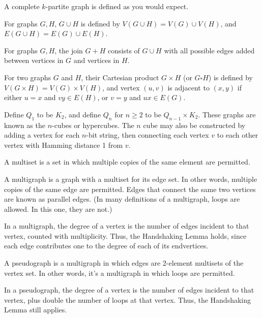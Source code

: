 \documentclass{article}
\begin{document}
    A complete $k$-partite graph is defined as you would expect.

\medskip
{}

    For graphs $G, H$, $G \cup H$ is defined by $V(G \cup H) = V(G) \cup V(H)$, and $E(G \cup H) = E(G) \cup E(H)$.

\medskip
{}

    For graphs $G, H$, the join $G + H$ consists of $G \cup H$ with all possible edges added between vertices in $G$ and vertices in $H$.

\medskip
{}

    For two graphs $G$ and $H$, their Cartesian product $G \times H$ (or $G \square H$) is defined by $V(G \times H) = V(G) \times V(H)$, and vertex $(u,v)$ is adjacent to $(x,y)$ if either $u=x$ and $vy \in E(H)$, or $v=y$ and $ux \in E(G)$.

\medskip
{}

    Define $Q_1$ to be $K_2$, and define $Q_n$ for $n \geq 2$ to be $Q_{n-1} \times K_2$.
    These graphs are known as the $n$-cubes or hypercubes.
    The $n$ cube may also be constructed by adding a vertex for each $n$-bit string, then connecting each vertex $v$ to each other vertex with Hamming distance 1 from $v$.

\medskip
{}

    A multiset is a set in which multiple copies of the same element are permitted.

\medskip
{}

    A multigraph is a graph with a multiset for its edge set. In other words, multiple copies of the same edge are permitted. Edges that connect the same two vertices are known as parallel edges. (In many definitions of a multigraph, loops are allowed. In this one, they are not.)

    In a multigraph, the degree of a vertex is the number of edges incident to that vertex, counted with multiplicity. Thus, the Handshaking Lemma holds, since each edge contributes one to the degree of each of its endvertices.

\medskip
{}

    A pseudograph is a multigraph in which edges are 2-element multisets of the vertex set. In other words, it's a multigraph in which loops are permitted.

    In a pseudograph, the degree of a vertex is the number of edges incident to that vertex, plus double the number of loops at that vertex. Thus, the Handshaking Lemma still applies.
\end{document}
